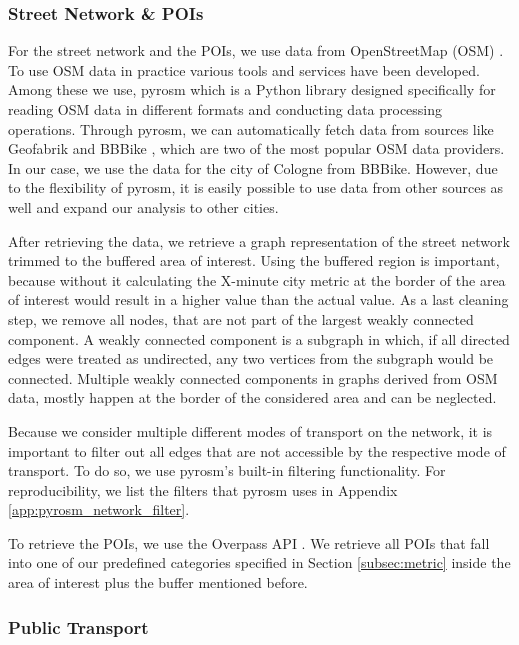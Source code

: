 \subsubsection{Street Network \& POIs}
\label{subs:street_network_pois}

For the street network and the POIs, we use data from OpenStreetMap (OSM) .
To use OSM data in practice various tools and services have been developed.
Among these we use, pyrosm  which is a Python library designed specifically for reading OSM data in different formats and conducting data processing operations.
Through pyrosm, we can automatically fetch data from sources like Geofabrik  and BBBike \cite{schneiderBBBikeExtractsOpenStreetMap2023}, which are two of the most popular OSM data providers.
In our case, we use the data for the city of Cologne from BBBike.
However, due to the flexibility of pyrosm, it is easily possible to use data from other sources as well and expand our analysis to other cities.

After retrieving the data, we retrieve a graph representation of the street network trimmed to the buffered area of interest.
Using the buffered region is important, because without it calculating the X-minute city metric at the border of the area of interest would result in a higher value than the actual value.
As a last cleaning step, we remove all nodes, that are not part of the largest weakly connected component.
A weakly connected component is a subgraph in which, if all directed edges were treated as undirected, any two vertices from the subgraph would be connected.
Multiple weakly connected components in graphs derived from OSM data, mostly happen at the border of the considered area and can be neglected.

Because we consider multiple different modes of transport on the network, it is important to filter out all edges that are not accessible by the respective mode of transport.
To do so, we use pyrosm's built-in filtering functionality.
For reproducibility, we list the filters that pyrosm uses in Appendix \ref{app:pyrosm_network_filter}.

To retrieve the POIs, we use the Overpass API .
We retrieve all POIs that fall into one of our predefined categories specified in Section \ref{subsec:metric} inside the area of interest plus the buffer mentioned before.

\subsubsection{Public Transport}
\label{subs:public_transport}

